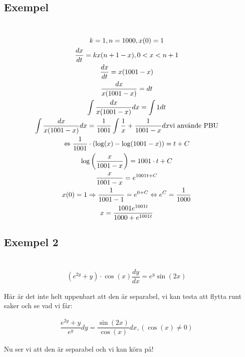 \subsection{Exempel}\hfill\\


\begin{equation*}
  \begin{gathered}
    k=1, n=1000, x(0)=1\\
    \dfrac{dx}{dt}=kx(n+1-x), 0<x<n+1\\
    \dfrac{dx}{dt}=x(1001-x)\\\dfrac{dx}{x(1001-x)}=dt\\
    \int\dfrac{dx}{x(1001-x)}dx = \int1dt\\
    \int\dfrac{dx}{x(1001-x)}dx = \dfrac{1}{1001}\int\dfrac{1}{x}+\dfrac{1}{1001-x}dx \text{vi använde PBU}\\
    \Leftrightarrow \dfrac{1}{1001}\cdot(\log(x)-\log(1001-x))=t+C\\
    \log\left(\dfrac{x}{1001-x}\right) = 1001\cdot t+C\\
    \dfrac{x}{1001-x}=e^{1001t+C}\\
    x(0)=1 \Rightarrow \dfrac{1}{1001-1}=e^{0+C}\Leftrightarrow e^C=\dfrac{1}{1000}\\
    x=\dfrac{1001e^{1001t}}{1000+e^{1001t}}
  \end{gathered}
\end{equation*}
\par\bigskip

\subsection{Exempel 2}\hfill\\


\begin{equation*}
  \begin{gathered}
    (e^{2y}+y)\cdot\cos(x)\dfrac{dy}{dx}=e^{y}\sin(2x)
  \end{gathered}
\end{equation*}
\par\bigskip
\noindent Här är det inte helt uppenbart att den är separabel, vi kan testa att flytta runt saker och se vad vi får:
\par\bigskip

\begin{equation*}
  \begin{gathered}
    \dfrac{e^{2y}+y}{e^y} dy=\dfrac{\sin(2x)}{\cos(x)}dx, (\cos(x)\neq0)
  \end{gathered}
\end{equation*}
\par\bigskip
\noindent Nu ser vi att den är separabel och vi kan köra på!



